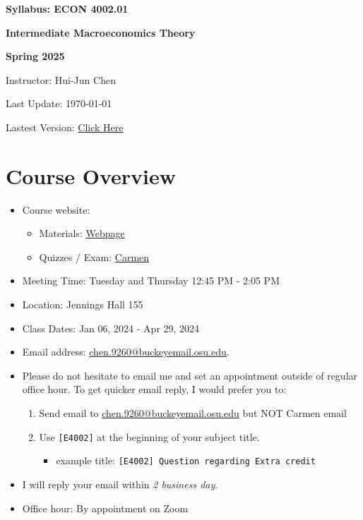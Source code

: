 \documentclass[12pt]{article}
\begin{document}
\centerline{\huge\bf Syllabus: ECON 4002.01}
\medskip
\centerline{\LARGE \bf Intermediate Macroeconomics Theory}
\medskip
\centerline{\LARGE \bf Spring 2025}
\medskip
\centerline{\Large Instructor: Hui-Jun Chen}
\centerline{Last Update: \today}
\centerline{Lastest Version: \href{https://huijunchen9260.github.io/pdf/IntermediateMacroSpring2025/syllabus/build/syllabus.pdf}{Click Here}}

\medskip



\section*{Course Overview}
\begin{itemize}

    \item Course website:
    \begin{itemize}
        \item Materials: \href{https://huijunchen9260.github.io/IntermediateMacroSpring2025.html}{Webpage}
        \item Quizzes / Exam: \href{https://osu.instructure.com/courses/179159}{Carmen}
    \end{itemize}
    \item Meeting Time: Tuesday and Thursday 12:45 PM - 2:05 PM
    \item Location: Jennings Hall 155
    \item Class Dates: Jan 06, 2024 - Apr 29, 2024
    \item Email address: \href{chen.9260@buckeyemail.osu.edu}{chen.9260@buckeyemail.osu.edu}.
    \item Please do not hesitate to email me and set an appointment outside of regular office hour. To get quicker email reply, I would prefer you to:
    \begin{enumerate}
        \item Send email to \href{chen.9260@buckeyemail.osu.edu}{chen.9260@buckeyemail.osu.edu} but NOT Carmen email
        \item Use \texttt{[E4002]} at the beginning of your subject title.
        \begin{itemize}
            \item example title: \texttt{[E4002] Question regarding Extra credit}
        \end{itemize}
    \end{enumerate}
    \item I will reply your email within \textit{2 business day}.
    \item Office hour: By appointment on Zoom
\end{itemize}
\end{document}

